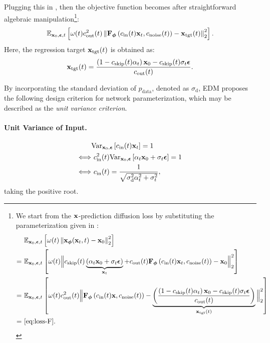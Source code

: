 Plugging this in , then the objective function becomes after straightforward algebraic manipulation\footnote{We start from the ${\mathbf{x}}$-prediction diffusion loss by substituting the parameterization given in :
\begin{align*}
    \begin{aligned}
      &~\mathbb{E}_{\rvx_0, \bm{\epsilon}, t} \left[\omega(t)\norm{ \rvx_{\bm{\phi}}(\rvx_t, t) - \rvx_0}_2^2\right] 
      \\= &~\mathbb{E}_{\rvx_0, \bm{\epsilon}, t} \left[\omega(t)\Big\Vert c_{\mathrm{skip}}(t) \underbrace{(\alpha_t \rvx_0+\sigma_t\beps)}_{\rvx_t} + c_{\mathrm{out}}(t) \rmF_{\bm{\phi}}\left(c_{\mathrm{in}}(t) \rvx_t, c_{\mathrm{noise}}(t)\right) - \rvx_0\Big\Vert_2^2\right]
        \\= &~\mathbb{E}_{\rvx_0, \bm{\epsilon}, t} \left[\omega(t)c_{\mathrm{out}}^2(t)\Big\Vert  \rmF_{\bm{\phi}}\left(c_{\mathrm{in}}(t) \rvx, c_{\mathrm{noise}}(t)\right) - \underbrace{\left(\frac{\left(1-c_{\mathrm{skip}}(t)\alpha_t\right)\rvx_0-c_{\mathrm{skip}}(t)\sigma_t \bm{\epsilon}}{c_{\mathrm{out}}(t)}\right)}_{\rvx_{\mathrm{tgt}}(t)}\Big\Vert_2^2\right]
        \\ = &~\mathrm{\Cref{eq:loss-F}}.
    \end{aligned}
\end{align*}

}:
\begin{align}\label{eq:loss-F}
   \mathbb{E}_{{\mathbf{x}}_0, \bm{\epsilon}, t} \left[\omega(t)c_{\mathrm{out}}^2(t)\left\lVert {\mathbf{F}}_{\bm{\phi}}\left(c_{\mathrm{in}}(t){\mathbf{x}}_t, c_{\mathrm{noise}}(t)\right) - {\mathbf{x}}_{\mathrm{tgt}}(t)\right\rVert_2^2\right].
\end{align}
Here, the regression target ${\mathbf{x}}_{\mathrm{tgt}}(t)$ is obtained as:
\[
{\mathbf{x}}_{\mathrm{tgt}}(t) = \frac{\left(1-c_{\mathrm{skip}}(t)\alpha_t\right){\mathbf{x}}_0-c_{\mathrm{skip}}(t)\sigma_t \bm{\epsilon}}{c_{\mathrm{out}}(t)}.
\]

By incorporating the standard deviation of $p_{\text{data}}$, denoted as $\sigma_{\mathrm{d}}$, EDM proposes the following design criterion for network parameterization, which may be described as the \emph{unit variance criterion}.

\paragraph{Unit Variance of Input.} 
\begin{align*}
    &\text{Var}_{{\mathbf{x}}_0,\bm{\epsilon}}\left[ c_{\mathrm{in}}(t){\mathbf{x}}_t\right] = 1 \nonumber
    \\ \Longleftrightarrow &~c_{\mathrm{in}}^2(t) \text{Var}_{{\mathbf{x}}_0,\bm{\epsilon}}\left[ \alpha_t {\mathbf{x}}_0 +\sigma_t \bm{\epsilon} \right] = 1 \nonumber
    \\ \Longleftrightarrow &~c_{\mathrm{in}}(t)  = \frac{1}{\sqrt{\sigma_{\mathrm{d}}^2 \alpha_t^2 + \sigma_t^2}},
\end{align*}
taking the positive root. 
